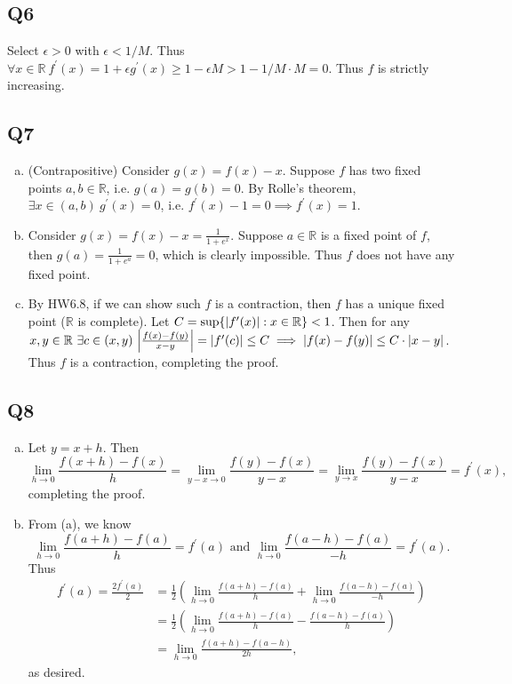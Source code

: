 \documentclass[12pt,lettersize]{article}
\newcommand{\R}{\mathbb{R}}
\begin{document}
	\subsection*{Q6}
	Select $\epsilon>0$ with $\epsilon<1/M$. Thus $\forall x\in\R\ f^\prime(x)=1+\epsilon g^\prime(x)\geq 1-\epsilon M>1-1/M\cdot M=0$. Thus $f$ is strictly increasing.
	\newpage
	
	\subsection*{Q7}
	\begin{enumerate}[(a)]
		\item (Contrapositive) Consider $g(x)=f(x)-x$. Suppose $f$ has two fixed points $a,b\in\R$, i.e. $g(a)=g(b)=0$. By Rolle's theorem, $\exists x\in(a,b)\ g^\prime(x)=0$, i.e. $f^\prime(x)-1=0\implies f^\prime(x)=1$.
		
		\item Consider $g(x)=f(x)-x=\frac{1}{1+e^x}$. Suppose $a\in\R$ is a fixed point of $f$, then $g(a)=\frac{1}{1+e^a}=0$, which is clearly impossible. Thus $f$ does not have any fixed point.
		
		\item By HW6.8, if we can show such $f$ is a contraction, then $f$ has a unique fixed point ($\R$ is complete). Let $C=\sup\{\abs{f^\prime(x)}:x\in\R\}<1$. Then for any $x,y\in\R\ \exists c\in(x,y)\ \abs{\frac{f(x)-f(y)}{x-y}}=\abs{f^\prime(c)}\leq C\implies \abs{f(x)-f(y)}\leq C\cdot\abs{x-y}$. Thus $f$ is a contraction, completing the proof.
	\end{enumerate}
	\newpage
	
	\subsection*{Q8}
	\begin{enumerate}[(a)]
		\item Let $y=x+h$. Then 
		\begin{displaymath}
			\lim_{h\rightarrow0}\frac{f(x+h)-f(x)}{h}=\lim_{y-x\rightarrow0}\frac{f(y)-f(x)}{y-x}=\lim_{y\rightarrow x}\frac{f(y)-f(x)}{y-x}=f^\prime(x),
		\end{displaymath}
		completing the proof.
		
		\item From (a), we know
		\begin{displaymath}
			\lim_{h\rightarrow0}\frac{f(a+h)-f(a)}{h}=f^\prime(a)\text{ and }\lim_{h\rightarrow0}\frac{f(a-h)-f(a)}{-h}=f^\prime(a).
		\end{displaymath}
		Thus 
		\begin{align*}
			f^\prime(a)=\frac{2f^\prime(a)}{2}&=\frac{1}{2}\left(\lim_{h\rightarrow0}\frac{f(a+h)-f(a)}{h}+\lim_{h\rightarrow0}\frac{f(a-h)-f(a)}{-h}\right)\\
			&=\frac{1}{2}\left(\lim_{h\rightarrow0}\frac{f(a+h)-f(a)}{h}-\frac{f(a-h)-f(a)}{h}\right)\\
			&=\lim_{h\rightarrow0}\frac{f(a+h)-f(a-h)}{2h},
		\end{align*}
		as desired.
	\end{enumerate}
	\newpage
	
\end{document}
